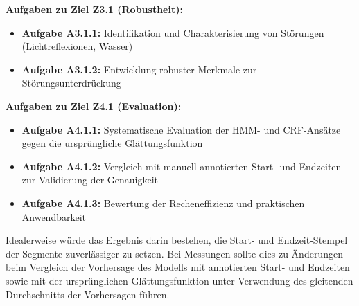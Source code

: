 \textbf{Aufgaben zu Ziel Z3.1 (Robustheit):}
\begin{itemize}
\item \textbf{Aufgabe A3.1.1:} Identifikation und Charakterisierung von Störungen (Lichtreflexionen, Wasser)
\item \textbf{Aufgabe A3.1.2:} Entwicklung robuster Merkmale zur Störungsunterdrückung
\end{itemize}

\textbf{Aufgaben zu Ziel Z4.1 (Evaluation):}
\begin{itemize}
\item \textbf{Aufgabe A4.1.1:} Systematische Evaluation der HMM- und CRF-Ansätze gegen die ursprüngliche Glättungsfunktion
\item \textbf{Aufgabe A4.1.2:} Vergleich mit manuell annotierten Start- und Endzeiten zur Validierung der Genauigkeit
\item \textbf{Aufgabe A4.1.3:} Bewertung der Recheneffizienz und praktischen Anwendbarkeit
\end{itemize}

Idealerweise würde das Ergebnis darin bestehen, die Start- und Endzeit-Stempel der Segmente zuverlässiger zu setzen. Bei Messungen sollte dies zu Änderungen beim Vergleich der Vorhersage des Modells mit annotierten Start- und Endzeiten sowie mit der ursprünglichen Glättungsfunktion unter Verwendung des gleitenden Durchschnitts der Vorhersagen führen.
